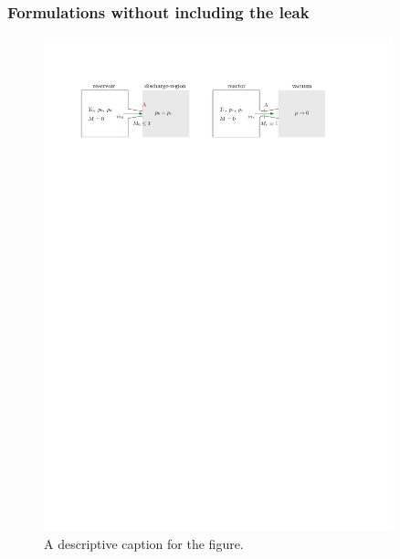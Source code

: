 \subsubsection*{Formulations without including the leak}
	\begin{figure}[H]
	    \centering
	    \includegraphics[width=0.9\textwidth]{src/03_analytical-work/fig_disconnected-reservoirs.pdf}
	    \caption{A descriptive caption for the figure.}
	    \label{fig:disconnected-reservoirs}
	\end{figure}

